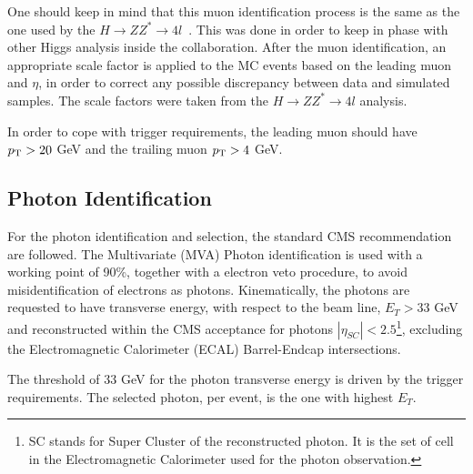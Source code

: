 





One should keep in mind that this muon identification process is the same as the one used by the $H \rightarrow ZZ^{*} \rightarrow 4l$~\cite{higgs_zz_4l_papper}. This was done in order to keep in phase with other Higgs analysis inside the collaboration. After the muon identification, an appropriate scale factor is applied to the MC events based on the leading muon \PT and $\eta$, in order to correct any possible discrepancy between data and simulated samples. The scale factors were taken from the $H \rightarrow ZZ^{*} \rightarrow 4l$ analysis.

In order to cope with trigger requirements, the leading muon should have $p_{\mathrm{T}} > 20$ GeV and the trailing muon $p_{\mathrm{T}} > 4$ GeV.


\subsection{Photon Identification}
\label{sec:photon_id}

For the photon identification and selection, the standard CMS recommendation are followed. The Multivariate (MVA) Photon identification is used with a working point of 90\%, together with a electron veto procedure, to avoid misidentification of electrons as photons. Kinematically, the photons are requested to have transverse energy, with respect to the beam line, $E_{T} > 33$ GeV and reconstructed within the CMS acceptance for photons $|\eta_{SC}| < 2.5$\footnote{SC stands for Super Cluster of the reconstructed photon. It is the set of cell in the Electromagnetic Calorimeter used for the photon observation.}, excluding the Electromagnetic Calorimeter (ECAL) Barrel-Endcap intersections.

The threshold of 33 GeV for the photon transverse energy is driven by the trigger requirements. The selected photon, per event, is the one with highest $E_{T}$.


